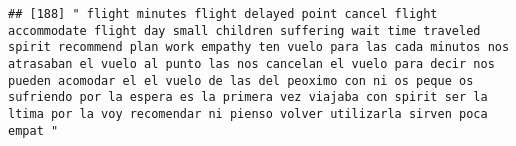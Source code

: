 \documentclass[
]{article}
\begin{document}
\begin{verbatim}
## [188] " flight minutes flight delayed point cancel flight accommodate flight day small children suffering wait time traveled spirit recommend plan work empathy ten vuelo para las cada minutos nos atrasaban el vuelo al punto las nos cancelan el vuelo para decir nos pueden acomodar el el vuelo de las del peoximo con ni os peque os sufriendo por la espera es la primera vez viajaba con spirit ser la ltima por la voy recomendar ni pienso volver utilizarla sirven poca empat "                                                                                                                                                                                                                                                                                                                                                                                                                                                                                                                                                                                                                                                                                                                                                                                                                                                                                                                                                                                                                                                                                                                                                                                                                                                                                                            

\end{verbatim}
\end{document}
